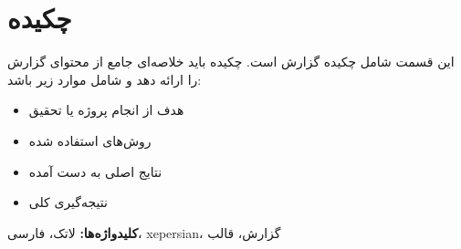 \chapter*{چکیده}

این قسمت شامل چکیده گزارش است. چکیده باید خلاصه‌ای جامع از محتوای گزارش را ارائه دهد و شامل موارد زیر باشد:

\begin{itemize}
    \item هدف از انجام پروژه یا تحقیق
    \item روش‌های استفاده شده
    \item نتایج اصلی به دست آمده
    \item نتیجه‌گیری کلی
\end{itemize}

\vspace{1cm}

\textbf{کلیدواژه‌ها:} لاتک، فارسی، xepersian، گزارش، قالب

\newpage

